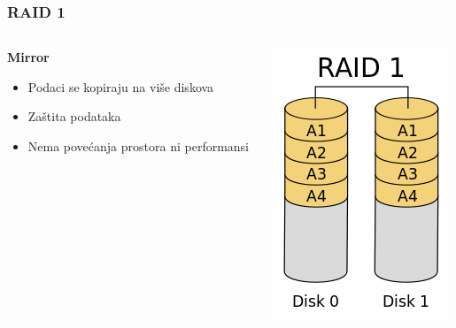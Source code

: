 \documentclass[t]{beamer}
\begin{document}
\begin{frame}
	\frametitle{RAID 1}
	
	\begin{columns}[T]
        \begin{column}{0.6\textwidth}
		\textbf{Mirror}
		\begin{itemize}
			\item Podaci se kopiraju na više diskova
		\end{itemize}
		\begin{itemize}
			\item Zaštita podataka
			\item Nema povećanja prostora ni performansi
		\end{itemize}
	\end{column}
	\begin{column}{0.3\textwidth}
		\includegraphics[width=\textwidth]{200px-RAID_1.png}
	\end{column}
	\end{columns}
\end{frame}
\end{document}
